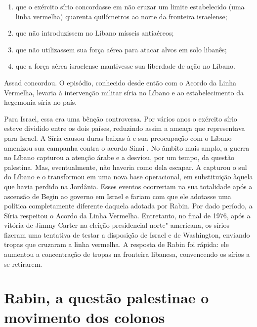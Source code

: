 \begin{enumerate}
\def\labelenumi{\arabic{enumi}.}
\item
  que o exército sírio concordasse em não cruzar um limite estabelecido
  (uma linha vermelha) quarenta quilômetros ao norte da fronteira
  israelense;
\item
  que não introduzissem no Líbano mísseis antiaéreos;
\item
  que não utilizassem sua força aérea para atacar alvos em solo
  libanês;
\item
  que a força aérea israelense mantivesse sua liberdade de ação no
  Líbano.
\end{enumerate}

Assad concordou. O episódio, conhecido desde então com o Acordo da Linha
Vermelha,
levaria à intervenção militar síria no Líbano e ao estabelecimento da
hegemonia síria no país.

Para Israel, essa era uma bênção controversa. Por vários anos o exército sírio
esteve dividido entre os dois países, reduzindo assim a ameaça que
representava para Israel. A Síria causou duras baixas à  e sua
preocupação com o Líbano amenizou sua campanha contra o acordo Sinai .
No âmbito mais amplo, a guerra no Líbano capturou a atenção árabe e a
desviou, por um tempo, da questão palestina. Mas, eventualmente, não
haveria como dela escapar. A  capturou o sul do Líbano e o
transformou em uma nova base operacional, em substituição àquela que
havia perdido na Jordânia. Esses eventos ocorreriam na sua totalidade
após a ascensão de Begin ao governo em Israel e fariam com que ele
adotasse uma política completamente diferente daquela adotada por Rabin.
Por dado período, a Síria respeitou o Acordo da Linha Vermelha. Entretanto, no
final de 1976, após a vitória de Jimmy Carter na eleição presidencial
norte"-americana, os sírios fizeram uma tentativa de testar a disposição
de Israel e de Washington, enviando tropas que cruzaram a linha
vermelha. A resposta de Rabin foi rápida: ele aumentou a concentração de
tropas na fronteira libanesa, convencendo os sírios a se
retirarem.

\section{Rabin, a questão palestina\break e o movimento dos colonos}

